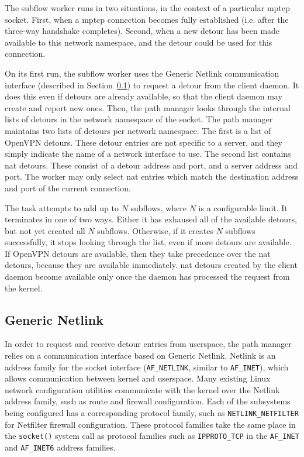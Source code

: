 \documentclass{cwru}
\begin{document}
The subflow worker runs in two situations, in the context of a particular
\ac{mptcp} socket. First, when a \ac{mptcp} connection becomes fully established
(i.e. after the three-way handshake completes). Second, when a new detour has
been made available to this network namespace, and the detour could be used for
this connection.

On its first run, the subflow worker uses the Generic Netlink communication
interface (described in Section~\ref{s:genl}) to request a detour from the
client daemon. It does this even if detours are already available, so that the
client daemon may create and report new ones. Then, the path manager looks
through the internal lists of detours in the network namespace of the socket.
The path manager maintains two lists of detours per network namespace. The first
is a list of OpenVPN detours. These detour entries are not specific to a server,
and they simply indicate the name of a network interface to use. The second list
contains \ac{nat} detours. These consist of a detour address and port, and a
server address and port. The worker may only select \ac{nat} entries which match
the destination address and port of the current connection.

The task attempts to add up to $N$ subflows, where $N$ is a configurable limit.
It terminates in one of two ways. Either it has exhaused all of the available
detours, but not yet created all $N$ subflows. Otherwise, if it creates $N$
subflows successfully, it stops looking through the list, even if more detours
are available. If OpenVPN detours are available, then they take precedence over
the \ac{nat} detours, because they are available immediately. \ac{nat} detours
created by the client daemon become available only once the daemon has processed
the request from the kernel.

\subsection{Generic Netlink}
\label{s:genl}

In order to request and receive detour entries from userspace, the path manager
relies on a communication interface based on Generic Netlink. Netlink is an
address family for the socket interface (\texttt{AF\_NETLINK}, similar to
\texttt{AF\_INET}), which allows communication between kernel and userspace.
Many existing Linux network configuration utilities communicate with the kernel
over the Netlink address family, such as route and firewall configuration. Each
of the subsystems being configured has a corresponding protocol family, such as
\texttt{NETLINK\_NETFILTER} for Netfilter firewall configuration. These protocol
families take the same place in the \texttt{socket()} system call as protocol
families such as \texttt{IPPROTO\_TCP} in the \texttt{AF\_INET} and
\texttt{AF\_INET6} address families.
\end{document}

